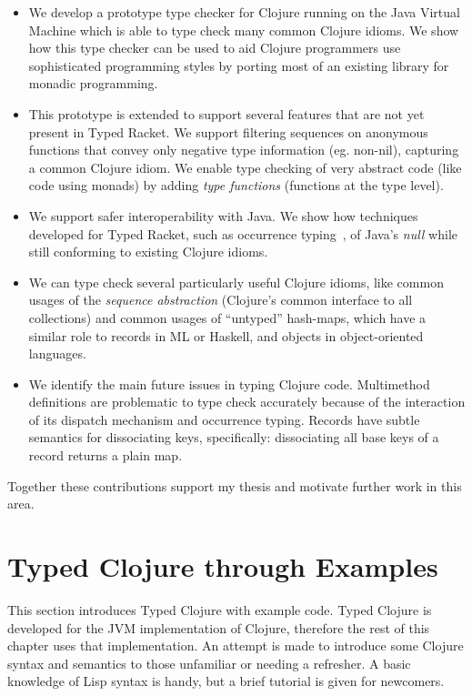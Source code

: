 \begin{itemize}
  \item We develop a prototype type checker for Clojure running on the Java Virtual Machine
        which is able to type check many common Clojure idioms.
        We show how this type checker can be used to aid Clojure programmers use sophisticated
        programming styles by porting most of an existing library for monadic programming.

  \item This prototype is extended to support several features that are not yet present in Typed Racket.
        We support filtering sequences on anonymous functions that convey only negative type information
        (eg. non-nil), capturing a common Clojure idiom.
        We enable type checking of very abstract code (like code using monads)
        by adding \emph{type functions} (functions at the type level).

  \item We support safer interoperability with Java. We show how techniques developed for
        Typed Racket, such as occurrence typing~\cite{TF10},  of Java's \emph{null}
        while still conforming to existing Clojure idioms.

  \item We can type check several particularly useful Clojure idioms, like common usages of the \emph{sequence abstraction}
        (Clojure's common interface to all collections) and 
        common usages of ``untyped'' hash-maps, which have a similar role to records in ML or Haskell,
        and objects in object-oriented languages.

  \item We identify the main future issues in typing Clojure code. Multimethod definitions are problematic
        to type check accurately because of the interaction of its dispatch mechanism and occurrence typing.
        Records have subtle semantics for dissociating keys, specifically: dissociating all base keys of a record returns
        a plain map.
\end{itemize}

Together these contributions support my thesis and motivate further work in this area.

\section{Typed Clojure through Examples}

This section introduces Typed Clojure with example code. 
Typed Clojure is developed for the JVM implementation of Clojure, therefore
the rest of this chapter uses that implementation.
An attempt is
made to introduce some Clojure syntax and semantics to those unfamiliar or needing a refresher.
A basic knowledge of Lisp syntax is handy, but a brief tutorial is given
for newcomers.

